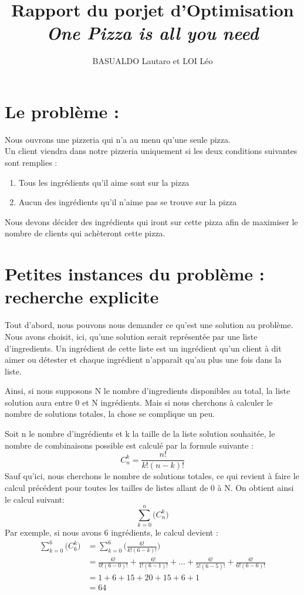 \documentclass{article}
\title{Rapport du porjet d'Optimisation\newline
    \textit{One Pizza is all you need}}
\author{BASUALDO Lautaro et LOI Léo}
\begin{document}
\maketitle

\tableofcontents
\newpage

\section{Le problème :}

Nous ouvrons une pizzeria qui n'a au menu qu'une seule pizza.\\
Un client viendra dans notre pizzeria uniquement si les deux conditions suivantes sont remplies :
\begin{enumerate}
    \item Tous les ingrédients qu'il aime sont sur la pizza
    \item Aucun des ingrédients qu'il n'aime pas se trouve sur la pizza
\end{enumerate}
Nous devons décider des ingrédients qui iront sur cette pizza afin de maximiser le nombre de clients qui achèteront cette pizza.

\section{Petites instances du problème : recherche explicite}

Tout d'abord, nous pouvons nous demander ce qu'est une solution au problème.\newline
Nous avons choisit, ici, qu'une solution serait représentée par une liste d'ingredients.
Un ingrédient de cette liste est un ingrédient qu'un client à dit aimer ou détester et chaque ingrédient n'apparaît qu'au plus une fois dans la liste.

Ainsi, si nous supposons N le nombre d'ingredients disponibles au total, la liste solution aura entre 0 et N ingrédients.\newline
Mais si nous cherchons à calculer le nombre de solutions totales, la chose se complique un peu.

Soit n le nombre d'ingrédients et k la taille de la liste solution souhaitée, le nombre de combinaisons possible est calculé par la formule suivante :
$$C_{n}^{k}=\frac{n!}{k!(n-k)!}$$
Sauf qu'ici, nous cherchons le nombre de solutions totales, ce qui revient à faire le calcul précédent pour toutes les tailles de listes allant de 0 à N.\newline
On obtient ainsi le calcul suivant:
$$\sum_{k=0}^{n}\bigl(C_{n}^{k}\bigr)$$
Par exemple, si nous avons 6 ingrédients, le calcul devient :
\begin{align*}
    \sum_{k=0}^{6}\bigl(C_{6}^{k}\bigr)&=\sum_{k=0}^{6}\bigl(\frac{6!}{k!(6-k)!}\bigr)\\
    &=\frac{6!}{0!(6-0)!}+\frac{6!}{1!(6-1)!}+...+\frac{6!}{5!(6-5)!}+\frac{6!}{6!(6-6)!}\\
    &= 1 + 6 + 15 + 20 + 15 + 6 + 1\\
    &=64
\end{align*}
\end{document}
